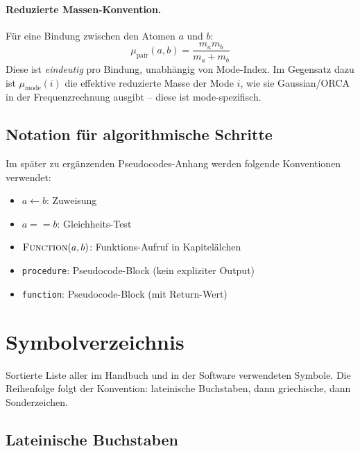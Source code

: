 \documentclass[11pt,a4paper,twoside]{article}
\theoremstyle{remark}
\begin{document}
\paragraph{Reduzierte Massen-Konvention.}
F\"ur eine Bindung zwischen den Atomen $a$ und $b$:
\begin{equation}
  \mu_\text{pair}(a, b) = \frac{m_a m_b}{m_a + m_b}
\end{equation}
Diese ist \emph{eindeutig} pro Bindung, unabh\"angig von Mode-Index.
Im Gegensatz dazu ist $\mu_\text{mode}(i)$ die effektive reduzierte
Masse der Mode $i$, wie sie Gaussian/ORCA in der Frequenzrechnung
ausgibt -- diese ist mode-spezifisch.

\subsection{Notation f\"ur algorithmische Schritte}

Im sp\"ater zu erg\"anzenden Pseudocodes-Anhang werden folgende Konventionen
verwendet:

\begin{itemize}\setlength{\itemsep}{2pt}
  \item $a \gets b$: Zuweisung
  \item $a == b$: Gleichheits-Test
  \item $\textsc{Function}(a, b)$: Funktions-Aufruf in Kapitel\"alchen
  \item \texttt{procedure}: Pseudocode-Block (kein expliziter Output)
  \item \texttt{function}: Pseudocode-Block (mit Return-Wert)
\end{itemize}

\section{Symbolverzeichnis}
\label{app:symbols}

Sortierte Liste aller im Handbuch und in der Software verwendeten
Symbole. Die Reihenfolge folgt der Konvention: lateinische
Buchstaben, dann griechische, dann Sonderzeichen.

\subsection{Lateinische Buchstaben}
\end{document}
